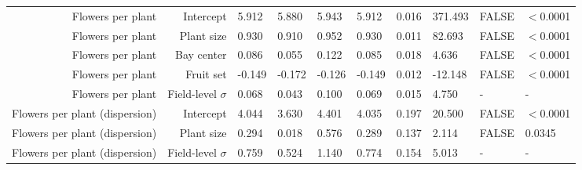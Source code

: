 \begin{landscape}
\begin{longtable}{|r|r|l|l|l|l|l|l|l|l|}
  Flowers per plant & Intercept & 5.912 & 5.880 & 5.943 & 5.912 & 0.016 & 371.493 & FALSE & $<$0.0001 \\ 
  Flowers per plant & Plant size & 0.930 & 0.910 & 0.952 & 0.930 & 0.011 & 82.693 & FALSE & $<$0.0001 \\ 
  Flowers per plant & Bay center & 0.086 & 0.055 & 0.122 & 0.085 & 0.018 & 4.636 & FALSE & $<$0.0001 \\ 
  Flowers per plant & Fruit set & -0.149 & -0.172 & -0.126 & -0.149 & 0.012 & -12.148 & FALSE & $<$0.0001 \\ 
  Flowers per plant & Field-level $\sigma$ & 0.068 & 0.043 & 0.100 & 0.069 & 0.015 & 4.750 & - & - \\ 
  Flowers per plant (dispersion) & Intercept & 4.044 & 3.630 & 4.401 & 4.035 & 0.197 & 20.500 & FALSE & $<$0.0001 \\ 
  Flowers per plant (dispersion) & Plant size & 0.294 & 0.018 & 0.576 & 0.289 & 0.137 & 2.114 & FALSE & 0.0345 \\ 
  Flowers per plant (dispersion) & Field-level $\sigma$ & 0.759 & 0.524 & 1.140 & 0.774 & 0.154 & 5.013 & - & - \\ 
    

\end{longtable}
\end{landscape}
